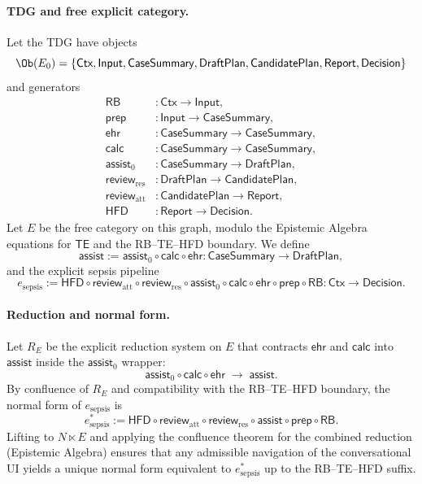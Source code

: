 \paragraph{TDG and free explicit category.}
Let the TDG have objects
\[
  \Ob(E_0) = \{\textsf{Ctx}, \textsf{Input}, \textsf{CaseSummary},
  \textsf{DraftPlan}, \textsf{CandidatePlan}, \textsf{Report}, \textsf{Decision}\}
\]
and generators
\begin{align*}
  \mathsf{RB} &: \textsf{Ctx} \to \textsf{Input}, \\
  \mathsf{prep} &: \textsf{Input} \to \textsf{CaseSummary}, \\
  \mathsf{ehr} &: \textsf{CaseSummary} \to \textsf{CaseSummary}, \\
  \mathsf{calc} &: \textsf{CaseSummary} \to \textsf{CaseSummary}, \\
  \mathsf{assist}_0 &: \textsf{CaseSummary} \to \textsf{DraftPlan}, \\
  \mathsf{review}_\mathrm{res} &: \textsf{DraftPlan} \to \textsf{CandidatePlan}, \\
  \mathsf{review}_\mathrm{att} &: \textsf{CandidatePlan} \to \textsf{Report}, \\
  \mathsf{HFD} &: \textsf{Report} \to \textsf{Decision}.
\end{align*}
Let $E$ be the free category on this graph, modulo the Epistemic Algebra equations for $\mathsf{TE}$ and
the RB--TE--HFD boundary. We define
\[
  \mathsf{assist} := \mathsf{assist}_0 \circ \mathsf{calc} \circ \mathsf{ehr}
  : \textsf{CaseSummary} \to \textsf{DraftPlan},
\]
and the explicit sepsis pipeline
\[
  e_{\mathrm{sepsis}} :=
  \mathsf{HFD} \circ \mathsf{review}_\mathrm{att} \circ \mathsf{review}_\mathrm{res} \circ
  \mathsf{assist}_0 \circ \mathsf{calc} \circ \mathsf{ehr} \circ \mathsf{prep} \circ \mathsf{RB}
  : \textsf{Ctx} \to \textsf{Decision}.
\]

\paragraph{Reduction and normal form.}
Let $R_E$ be the explicit reduction system on $E$ that contracts $\mathsf{ehr}$ and $\mathsf{calc}$
into $\mathsf{assist}$ inside the $\mathsf{assist}_0$ wrapper:
\[
  \mathsf{assist}_0 \circ \mathsf{calc} \circ \mathsf{ehr} \;\to\; \mathsf{assist}.
\]
By confluence of $R_E$ and compatibility with the RB--TE--HFD boundary, the normal form of
$e_{\mathrm{sepsis}}$ is
\[
  e_{\mathrm{sepsis}}^{\ast} :=
  \mathsf{HFD} \circ \mathsf{review}_\mathrm{att} \circ \mathsf{review}_\mathrm{res} \circ
  \mathsf{assist} \circ \mathsf{prep} \circ \mathsf{RB}.
\]
Lifting to $N \ltimes E$ and applying the confluence theorem for the combined reduction (Epistemic Algebra)
ensures that any admissible navigation of the conversational UI yields a unique normal form
equivalent to $e_{\mathrm{sepsis}}^{\ast}$ up to the RB--TE--HFD suffix.

